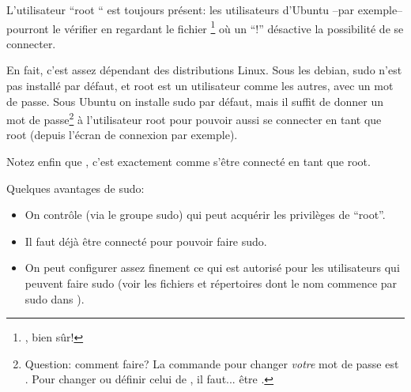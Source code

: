 L'utilisateur ``root `` est toujours présent: les
utilisateurs d'Ubuntu --par exemple-- pourront le vérifier en regardant
le fichier  \footnote{, bien sûr!} où un
``!'' désactive la possibilité de se connecter.

En fait, c'est assez dépendant des distributions Linux. Sous les
debian, sudo n'est pas installé par défaut, et root est
un utilisateur comme les autres, avec un mot de passe. Sous Ubuntu on
installe sudo par défaut, mais il suffit de donner un 
mot de passe\footnote{Question: comment faire? La commande pour changer
  \emph{votre} mot de passe est . Pour changer ou définir
  celui de , il faut... être .} à l'utilisateur root pour pouvoir aussi se connecter en tant
que root (depuis l'écran de connexion par exemple).

Notez enfin que , c'est exactement comme s'être connecté en
tant que root.

Quelques avantages de sudo:
\begin{itemize}
\item On contrôle (via le groupe sudo) qui peut acquérir les
  privilèges de  ``root''.
\item Il faut déjà être connecté pour pouvoir faire sudo.
\item On peut configurer assez finement ce qui est autorisé pour les
  utilisateurs qui peuvent faire sudo (voir les fichiers et
  répertoires dont le nom commence par sudo dans ).
\end{itemize}
